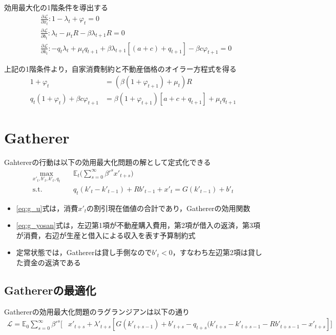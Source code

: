 \documentclass[dvipdfmx]{jlreq}
\begin{document}
効用最大化の1階条件を導出する
\begin{align}
  &\frac{\partial\mathcal{L}}{\partial x_t}: 1 - \lambda_t + \varphi_t = 0 \\
  &\frac{\partial\mathcal{L}}{\partial b_t}: \lambda_t - \mu_t R - \beta \lambda_{t+1} R = 0 \\
  &\frac{\partial\mathcal{L}}{\partial k_t}: - q_t \lambda_t + \mu_t q_{t+1} + \beta \lambda_{t+1}[(a+c) + q_{t+1}] - \beta c \varphi_{t+1} = 0
\end{align}  

上記の1階条件より，自家消費制約と不動産価格のオイラー方程式を得る
\begin{align}
  1 + \varphi_t &= (\beta(1+\varphi_{t+1}) + \mu_t) R \\
  q_t (1 + \varphi_t) + \beta c \varphi_{t+1} &= \beta(1 + \varphi_{t+1})[a + c + q_{t+1}] + \mu_t q_{t+1} \label{eq:f_land}
\end{align}

\newpage

\section{Gatherer}
Gahtererの行動は以下の効用最大化問題の解として定式化できる
\begin{align}
  \max_{x'_t, b'_t, k'_t, q_t} \quad & \mathbb{E}_t \bigg( \sum_{s=0}^{\infty} \beta'^s x'_{t+s} \bigg) \label{eq:g_u} \\
\text{s.t.} \quad & q_t(k'_t - k'_{t-1}) + R b'_{t-1} + x'_t = G(k'_{t-1}) + b'_t \label{eq:g_yosan}
\end{align}

\begin{itemize}
  \item \eqref{eq:g_u}式は，消費$x'_t$の割引現在価値の合計であり，Gathererの効用関数
  \item \eqref{eq:g_yosan}式は，左辺第1項が不動産購入費用，第2項が借入の返済，第3項が消費，右辺が生産と借入による収入を表す予算制約式
  \item 定常状態では，Gathererは貸し手側なので$b'_t < 0$，すなわち左辺第2項は貸した資金の返済である
\end{itemize}

\subsection{Gathererの最適化}
Gathererの効用最大化問題のラグランジアンは以下の通り
\begin{equation}
  \begin{aligned}
    \mathcal{L} = \mathbb{E}_0 \sum_{s=0}^{\infty} \beta'^s \bigg[ & x'_{t+s} + \lambda'_{t+s} [G(k'_{t+s-1}) + b'_{t+s} - q_{t+s} (k'_{t+s} - k'_{t+s-1} - R b'_{t+s-1} - x'_{t+s}] \bigg]
  \end{aligned}
\end{equation}
\end{document}
